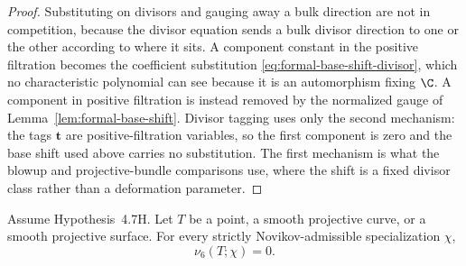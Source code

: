 \begin{proof}
Substituting on divisors and gauging away a bulk direction are not in
competition, because the divisor equation sends a bulk divisor direction to
one or the other according to where it sits.  A component constant in the
positive filtration becomes the coefficient substitution
\eqref{eq:formal-base-shift-divisor}, which no characteristic polynomial can
see because it is an automorphism fixing \(\C\).  A component in positive
filtration is instead removed by the normalized gauge of
Lemma~\ref{lem:formal-base-shift}.  Divisor tagging uses only the second
mechanism: the tags \(\boldsymbol t\) are positive-filtration variables, so
the first component is zero and the base shift used above carries
no substitution.  The first mechanism is what the blowup and
projective-bundle comparisons use, where the shift is a fixed divisor class
rather than a deformation parameter.
\end{proof}

\begin{proposition}
\label{prop:low-dimensional-vanishing}
Assume Hypothesis~4.7H.
Let \(T\) be a point, a smooth projective curve, or a smooth projective
surface.  For every strictly Novikov-admissible specialization \(\chi\),
\[
 \nu_6(T;\chi)=0.
 \tag{4.7}
 \label{eq:low-dimensional-vanishing}
\]
\end{proposition}

